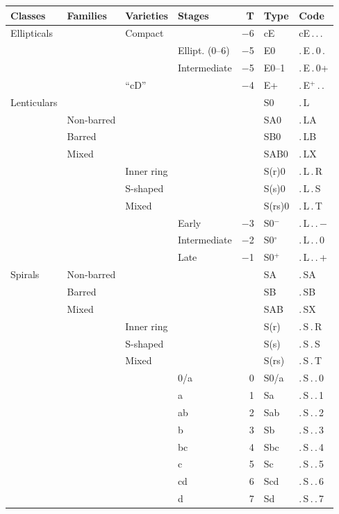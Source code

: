 \begin{center}
\begin{tabular}{l|l|l|l|r|l|l} \hline
Classes & Families & Varieties & Stages & T & Type & Code \\ \hline
Ellipticals & & Compact & & $-$6 & cE & cE\,.\,.\,. \\
 & & & Ellipt. (0--6) & $-$5 & E0 & .\,E\,.\,0\,. \\
 & & & Intermediate   & $-$5 & E0--1 & .\,E\,.\,0+ \\
 & & ``cD''  & & $-$4 & E+ & .\,E$^{+}$\,.\,. \\ \hline
Lenticulars & & & & & S0 & .\,L \\
 & Non-barred & & & & SA0 & .\,LA \\
 & Barred & & & & SB0 & .\,LB \\
 & Mixed & & & & SAB0 & .\,LX \\
 & & Inner ring & & & S(r)0 & .\,L\,.\,R \\
 & & S-shaped & & & S(s)0 & .\,L\,.\,S \\
 & & Mixed & & & S(rs)0 & .\,L\,.\,T \\
 & & & Early & $-$3 & S0$^{-}$ & .\,L\,.\,.\,$-$ \\
 & & & Intermediate & $-$2 & S0$^{\circ}$ & .\,L\,.\,.\,0 \\
 & & & Late & $-$1 & S0$^{+}$ & .\,L\,.\,.\,+ \\ \hline
Spirals & Non-barred & & & & SA & .\,SA \\
 & Barred & & & & SB & .\,SB \\
 & Mixed & & & & SAB & .\,SX \\
 & & Inner ring & & & S(r) & .\,S\,.\,R \\
 & & S-shaped & & & S(s) & .\,S\,.\,S \\
 & & Mixed & & & S(rs) & .\,S\,.\,T \\
 & & & 0/a & 0 & S0/a & .\,S\,.\,.\,0 \\
 & & & a & 1 & Sa & .\,S\,.\,.\,1 \\
 & & & ab & 2 & Sab & .\,S\,.\,.\,2 \\
 & & & b & 3 & Sb & .\,S\,.\,.\,3 \\
 & & & bc & 4 & Sbc & .\,S\,.\,.\,4 \\
 & & & c & 5 & Sc & .\,S\,.\,.\,5 \\
 & & & cd & 6 & Scd & .\,S\,.\,.\,6 \\
 & & & d & 7 & Sd & .\,S\,.\,.\,7 \\

\end{tabular}
\end{center}
